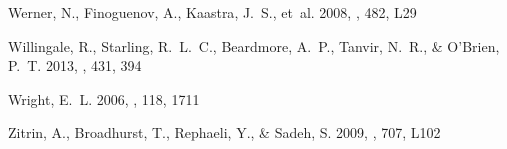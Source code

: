 \documentclass[11pt,a4paper,useAMS,iop]{emulateapj}
\begin{document}
\begin{thebibliography}{34}
{Werner}, N., {Finoguenov}, A., {Kaastra}, J.~S., {et~al.} 2008, \aap, 482, L29

{Willingale}, R., {Starling}, R.~L.~C., {Beardmore}, A.~P., {Tanvir}, N.~R., \&
  {O'Brien}, P.~T. 2013, \mnras, 431, 394

{Wright}, E.~L. 2006, \pasp, 118, 1711

{Zitrin}, A., {Broadhurst}, T., {Rephaeli}, Y., \& {Sadeh}, S. 2009, \apjl,
  707, L102

\end{thebibliography}

\clearpage
\end{document}
